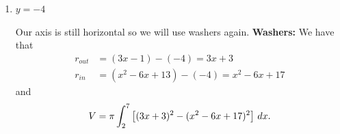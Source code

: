 \documentclass[noinstructornotes]{ximera}
\begin{document}
\begin{problem}
\begin{enumerate}
\begin{freeResponse}
		
		
		\end{freeResponse}
		
		
		
		\item  $y=-4$  
		\begin{freeResponse}
		Our axis is still horizontal so we will use washers again. 
		{\bf Washers: }
		We have that
			\begin{align*}
			r_{out} &= (3x-1) - (-4) = 3x + 3 \\
			r_{in} &= (x^2 - 6x +13) - (-4) = x^2 - 6x + 17
			\end{align*}
		and
			\[
			V = \pi \int_2^7 \left[ (3x+3)^2 - (x^2-6x+17)^2 \right] \,d x.
			\]
		

\end{freeResponse}
\end{enumerate}
\end{problem}
\end{document}
